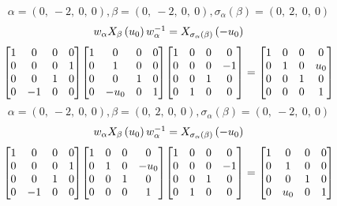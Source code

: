\documentclass[11pt]{article}
\theoremstyle{definition}
\begin{document}
\[
\alpha = \left( 0, \  -2, \  0, \  0\right), \beta = \left( 0, \  -2, \  0, \  0\right), \sigma_{\alpha}(\beta) = \left( 0, \  2, \  0, \  0\right)
\]
\[
\scaletoalign{\textwidth}{w_{\alpha} X_{\beta}\left(u_{0}\right) w_{\alpha}^{-1} = X_{\sigma_{\alpha}\left(\beta\right)}\left(- u_{0}\right)}
\]
\[
\scaletoalign{\textwidth}{{\left[\begin{matrix}1 & 0 & 0 & 0\\0 & 0 & 0 & 1\\0 & 0 & 1 & 0\\0 & -1 & 0 & 0\end{matrix}\right]} {\left[\begin{matrix}1 & 0 & 0 & 0\\0 & 1 & 0 & 0\\0 & 0 & 1 & 0\\0 & - u_{0} & 0 & 1\end{matrix}\right]} {\left[\begin{matrix}1 & 0 & 0 & 0\\0 & 0 & 0 & -1\\0 & 0 & 1 & 0\\0 & 1 & 0 & 0\end{matrix}\right]} = {\left[\begin{matrix}1 & 0 & 0 & 0\\0 & 1 & 0 & u_{0}\\0 & 0 & 1 & 0\\0 & 0 & 0 & 1\end{matrix}\right]}}
\]
\[
\alpha = \left( 0, \  -2, \  0, \  0\right), \beta = \left( 0, \  2, \  0, \  0\right), \sigma_{\alpha}(\beta) = \left( 0, \  -2, \  0, \  0\right)
\]
\[
\scaletoalign{\textwidth}{w_{\alpha} X_{\beta}\left(u_{0}\right) w_{\alpha}^{-1} = X_{\sigma_{\alpha}\left(\beta\right)}\left(- u_{0}\right)}
\]
\[
\scaletoalign{\textwidth}{{\left[\begin{matrix}1 & 0 & 0 & 0\\0 & 0 & 0 & 1\\0 & 0 & 1 & 0\\0 & -1 & 0 & 0\end{matrix}\right]} {\left[\begin{matrix}1 & 0 & 0 & 0\\0 & 1 & 0 & - u_{0}\\0 & 0 & 1 & 0\\0 & 0 & 0 & 1\end{matrix}\right]} {\left[\begin{matrix}1 & 0 & 0 & 0\\0 & 0 & 0 & -1\\0 & 0 & 1 & 0\\0 & 1 & 0 & 0\end{matrix}\right]} = {\left[\begin{matrix}1 & 0 & 0 & 0\\0 & 1 & 0 & 0\\0 & 0 & 1 & 0\\0 & u_{0} & 0 & 1\end{matrix}\right]}}
\]
\end{document}

